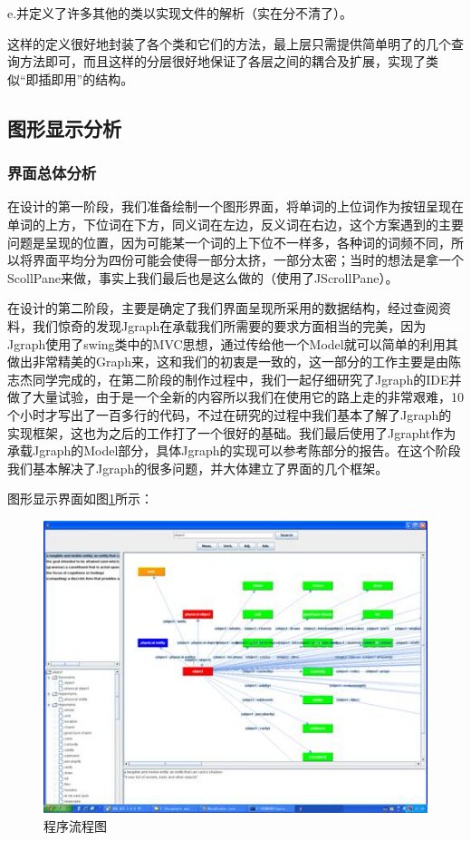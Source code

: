 \documentclass[a4paper,unicode=true,xetex]{article}
\begin{document}
e.并定义了许多其他的类以实现文件的解析（实在分不清了）。

这样的定义很好地封装了各个类和它们的方法，最上层只需提供简单明了的几个查询方法即可，而且这样的分层很好地保证了各层之间的耦合及扩展，实现了类似“即插即用”的结构。

\subsection{图形显示分析}

\subsubsection{界面总体分析}

在设计的第一阶段，我们准备绘制一个图形界面，将单词的上位词作为按钮呈现在单词的上方，下位词在下方，同义词在左边，反义词在右边，这个方案遇到的主要问题是呈现的位置，因为可能某一个词的上下位不一样多，各种词的词频不同，所以将界面平均分为四份可能会使得一部分太挤，一部分太密；当时的想法是拿一个ScollPane来做，事实上我们最后也是这么做的（使用了JScrollPane）。

在设计的第二阶段，主要是确定了我们界面呈现所采用的数据结构，经过查阅资料，我们惊奇的发现Jgraph在承载我们所需要的要求方面相当的完美，因为Jgraph使用了swing类中的MVC思想，通过传给他一个Model就可以简单的利用其做出非常精美的Graph来，这和我们的初衷是一致的，这一部分的工作主要是由陈志杰同学完成的，在第二阶段的制作过程中，我们一起仔细研究了Jgraph的IDE并做了大量试验，由于是一个全新的内容所以我们在使用它的路上走的非常艰难，10个小时才写出了一百多行的代码，不过在研究的过程中我们基本了解了Jgraph的实现框架，这也为之后的工作打了一个很好的基础。我们最后使用了Jgrapht作为承载Jgraph的Model部分，具体Jgraph的实现可以参考陈部分的报告。在这个阶段我们基本解决了Jgraph的很多问题，并大体建立了界面的几个框架。

图形显示界面如图\ref{fig}所示：
\begin{figure}
  \centering
  \includegraphics[scale=1.0]{screenshot.jpg}  
  \caption{程序流程图}
  \label{fig}
\end{figure}
\end{document}

